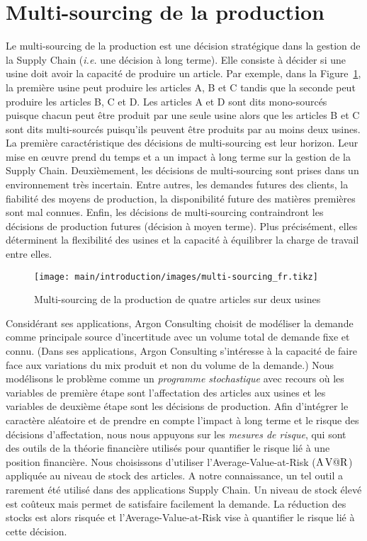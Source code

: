 \section{Multi-sourcing de la production}
\label{sec:intro:fr:multi-sourcing}


Le multi-sourcing de la production est une décision stratégique dans la gestion de la Supply Chain (\emph{i.e.} une décision à long terme).
Elle consiste à décider si une usine doit avoir la capacité de produire un article.
Par exemple, dans la Figure~\ref{fig:intro:fr:multi-sourcing}, la première usine peut produire les articles A, B et C tandis que la seconde peut produire les articles B, C et D.
Les articles A et D sont dits mono-sourcés puisque chacun peut être produit par une seule usine alors que les articles B et C sont dits multi-sourcés puisqu'ils peuvent être produits par au moins deux usines.
La première caractéristique des décisions de multi-sourcing est leur horizon.
Leur mise en \oe{}uvre prend du temps et a un impact à long terme sur la gestion de la Supply Chain.
Deuxièmement, les décisions de multi-sourcing sont prises dans un environnement très incertain.
Entre autres, les demandes futures des clients, la fiabilité des moyens de production, la disponibilité future des matières premières sont mal connues.
Enfin, les décisions de multi-sourcing contraindront les décisions de production futures (décision à moyen terme).
Plus précisément, elles déterminent la flexibilité des usines et la capacité à équilibrer la charge de travail entre elles.


\begin{figure}[!ht]
  \centering
  \texttt{[image: main/introduction/images/multi-sourcing\_fr.tikz]}
  \caption{Multi-sourcing de la production de quatre articles sur deux usines}
  \label{fig:intro:fr:multi-sourcing}
\end{figure}


Considérant ses applications, Argon Consulting choisit de modéliser la demande comme principale source d'incertitude avec un volume total de demande fixe et connu.
(Dans ses applications, Argon Consulting s'intéresse à la capacité de faire face aux variations du mix produit et non du volume de la demande.)
Nous modélisons le problème comme un \emph{programme stochastique} avec recours où les variables de première étape sont l'affectation des articles aux usines et les variables de deuxième étape sont les décisions de production.
Afin d'intégrer le caractère aléatoire et de prendre en compte l'impact à long terme et le risque des décisions d'affectation, nous nous appuyons sur les \emph{mesures de risque}, qui sont des outils de la théorie financière utilisés pour quantifier le risque lié à une position financière.
Nous choisissons d'utiliser l'Average-Value-at-Risk ($\operatorname{A\operatorname{V@R}}$) appliquée au niveau de stock des articles.
A notre connaissance, un tel outil a rarement été utilisé dans des applications Supply Chain.
Un niveau de stock élevé est coûteux mais permet de satisfaire facilement la demande.
La réduction des stocks est alors risquée et l'Average-Value-at-Risk vise à quantifier le risque lié à cette décision.


